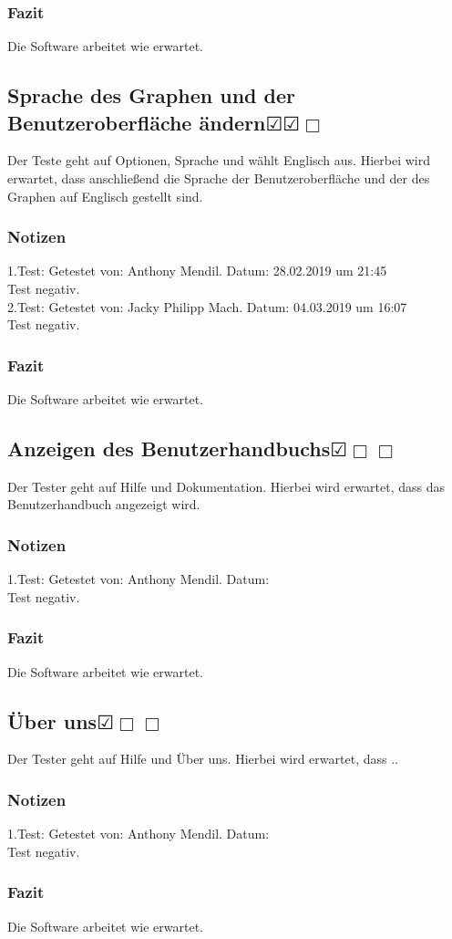 \documentclass[enabledeprecatedfontcommands]{scrartcl}
\newcommand{\subsectiont}[2]{\subsection[#1]{#1{\normalsize\normalfont #2}}}
\newcommand{\leer}{$\Box$}
\newcommand{\ok}{$\CheckedBox$}
\begin{document}
\subsubsection{Fazit}
Die Software arbeitet wie erwartet.

\subsectiont{Sprache des Graphen und der Benutzeroberfläche ändern}{\dotfill\ok\ok\leer}
Der Teste geht auf Optionen, Sprache und wählt Englisch aus. Hierbei wird erwartet, dass anschließend die Sprache der Benutzeroberfläche und der des Graphen auf Englisch gestellt sind.
\subsubsection{Notizen}
1.Test: Getestet von: Anthony Mendil. Datum: 28.02.2019 um 21:45 \\
Test negativ.\\
2.Test: Getestet von: Jacky Philipp Mach. Datum: 04.03.2019 um 16:07 \\
Test negativ.
\subsubsection{Fazit}
Die Software arbeitet wie erwartet.

\subsectiont{Anzeigen des Benutzerhandbuchs}{\dotfill\ok\leer\leer}
Der Tester geht auf Hilfe und Dokumentation. Hierbei wird erwartet, dass das Benutzerhandbuch angezeigt wird. 
\subsubsection{Notizen}
1.Test: Getestet von: Anthony Mendil. Datum: \\
Test negativ.
\subsubsection{Fazit}
Die Software arbeitet wie erwartet.

\subsectiont{Über uns}{\dotfill\ok\leer\leer}
Der Tester geht auf Hilfe und Über uns. Hierbei wird erwartet, dass ..
\subsubsection{Notizen}
1.Test: Getestet von: Anthony Mendil. Datum:  \\
Test negativ.
\subsubsection{Fazit}
Die Software arbeitet wie erwartet.
\end{document}
